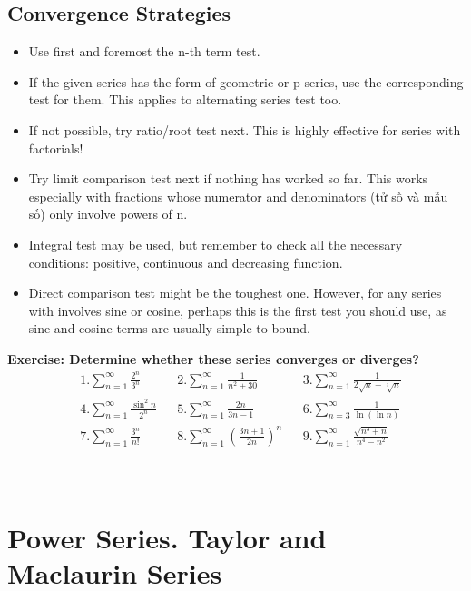\documentclass{article}
\begin{document}
\subsection{Convergence Strategies}
\begin{itemize}
    \item Use first and foremost the n-th term test.
    \item If the given series has the form of geometric or p-series, use the corresponding test for them.  This applies to alternating series test too. 
    \item If not possible, try ratio/root test next. This is highly effective for series with factorials!
    \item Try limit comparison test next if nothing has worked so far. This works especially with fractions whose numerator and denominators (tử số và mẫu số) only involve powers of n. 
    \item Integral test may be used, but remember to check all the necessary conditions: positive, continuous and decreasing function. 
    \item Direct comparison test might be the toughest one. However, for any series with involves sine or cosine, perhaps this is the first test you should use, as sine and cosine terms are usually simple to bound. 
\end{itemize}

\textbf{Exercise: Determine whether these series converges or diverges?}
\begin{align*}
&1. \sum_{n=1}^{\infty} \frac{2^n}{3^n} && 2. \sum_{n=1}^{\infty} \frac{1}{n^2 + 30} && 3. \sum_{n=1}^{\infty} \frac{1}{2\sqrt{n}+ \sqrt[3]{n}} \\
&4. \sum_{n=1}^{\infty} \frac{\sin^2{n}}{2^n} && 5. \sum_{n=1}^{\infty} \frac{2n}{3n-1} && 6. \sum_{n=3}^{\infty} \frac{1}{\ln{(\ln{n})}} \\
&7. \sum_{n=1}^{\infty} \frac{3^n}{n!} && 8. \sum_{n=1}^{\infty} \left(\frac{3n+1}{2n} \right)^n && 9. \sum_{n=1}^{\infty} \frac{\sqrt{n^3 + n}}{n^4 - n^2}
\end{align*}
\\
\\

%
%
%
%
\section{Power Series. Taylor and Maclaurin Series}
\end{document}
